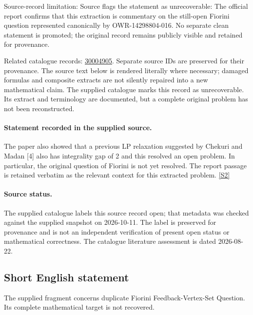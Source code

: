 \documentclass[11pt]{article}
\begin{document}
Source-record limitation: Source flags the statement as unrecoverable: The official report confirms that this extraction is commentary on the still-open Fiorini question represented canonically by OWR-14298804-016. No separate clean statement is promoted; the original record remains publicly visible and retained for provenance.

Related catalogue records: \href{https://mehmetmars7.github.io/Erdosproblems-llm-hunter/problem.html?type=open_problems&id=30004905}{30004905}. Separate source IDs are preserved for their provenance.
The source text below is rendered literally where necessary; damaged formulas and composite extracts are not silently repaired into a new mathematical claim.
The supplied catalogue marks this record as unrecoverable. Its extract and terminology are documented, but a complete original problem has not been reconstructed.
\paragraph{Statement recorded in the supplied source.}
The paper also showed that a previous LP relaxation suggested by Chekuri and Madan [4] also has integrality gap of 2 and this resolved an open problem. In particular, the original question of Fiorini is not yet resolved. The report passage is retained verbatim as the relevant context for this extracted problem. \href{https://doi.org/10.4171/owr/2024/50}{[S2]}
\paragraph{Source status.}
The supplied catalogue labels this source record open; that metadata was checked against the supplied snapshot on 2026-10-11. The label is preserved for provenance and is not an independent verification of present open status or mathematical correctness. The catalogue literature assessment is dated 2026-08-22.
\subsection{Short English statement}
The supplied fragment concerns duplicate Fiorini Feedback-Vertex-Set Question. Its complete mathematical target is not recovered.
\end{document}
